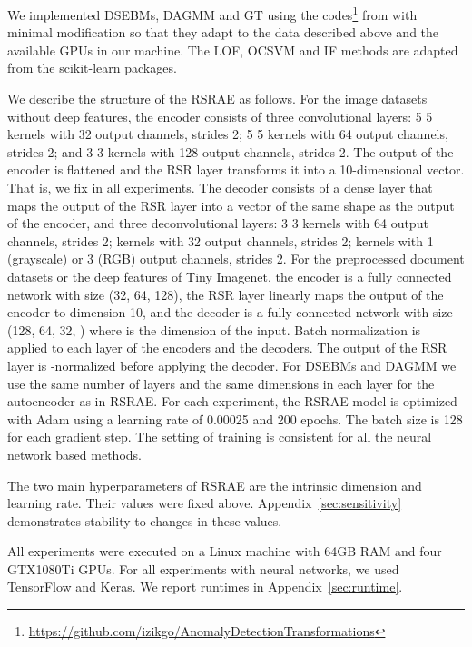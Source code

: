 \documentclass{article} \usepackage{iclr2020_conference,times}
\begin{document}
We implemented DSEBMs, DAGMM and GT using the codes\footnote{\url{https://github.com/izikgo/AnomalyDetectionTransformations}} from \citet{golan2018deep} with minimal modification so that they adapt to the data described above and the available GPUs in our machine. The LOF, OCSVM and IF methods are adapted from the scikit-learn packages.

We describe the structure of the RSRAE as follows. For the image datasets without deep features, the encoder consists of three convolutional layers: 5  5 kernels with 32 output channels, strides 2; 5  5 kernels with 64 output channels, strides 2; and 3  3 kernels with 128 output channels, strides 2. The output of the encoder is flattened and the RSR layer transforms it into a 10-dimensional vector. That is, we fix  in all experiments. The decoder consists of a dense layer that maps the output of the RSR layer into a vector of the same shape as the output of the encoder, and three deconvolutional layers: 3  3 kernels with 64 output channels, strides 2;  kernels with 32 output channels, strides 2;  kernels with 1 (grayscale) or 3 (RGB) output channels, strides 2. For the preprocessed document datasets or the deep features of Tiny Imagenet, the encoder is a fully connected network with size (32, 64, 128), the RSR layer linearly maps the output of the encoder to dimension 10, and the decoder is a fully connected network with size (128, 64, 32, ) where  is the dimension of the input. Batch normalization is applied to each layer of the encoders and the decoders. The output of the RSR layer is -normalized before applying the decoder. For DSEBMs and DAGMM we use the same number of layers and the same dimensions in each layer for the autoencoder as in RSRAE. For each experiment, the RSRAE model is optimized with Adam using a learning rate of 0.00025 and 200 epochs. The batch size is 128 for each gradient step. The setting of training is consistent for all the neural network based methods. 

{The two main hyperparameters of RSRAE are the intrinsic dimension  and learning rate. Their values were fixed above. Appendix~\ref{sec:sensitivity} demonstrates stability to changes in these values.}

All experiments were executed on a Linux machine with 64GB RAM and four GTX1080Ti GPUs.
For all experiments with neural networks, we used TensorFlow and Keras. We report runtimes in  Appendix~\ref{sec:runtime}.
\end{document}
